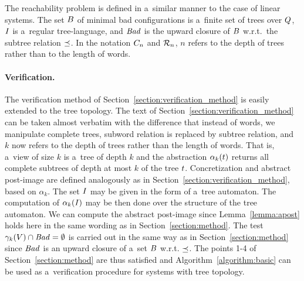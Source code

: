The reachability problem is defined in a~similar manner to the case of
linear systems. The set $B$ of minimal bad configurations is
a~finite set of trees over $Q$, $\mathit{I}$ is a~regular
tree-language, and $\mathit{Bad}$ is the upward closure of $B$ w.r.t.\ the
subtree relation $\preceq$.  In the notation $C_{n}$ and
$\mathcal{R}_{n}$, $n$ refers to the depth of trees rather than to the
length of words.

\paragraph{Verification.}
The verification method of Section~\ref{section:verification_method}
is easily extended to the tree topology. The text of
Section~\ref{section:verification_method} can be taken almost verbatim
with the difference that instead of words, we manipulate complete
trees, subword relation is replaced by subtree relation, and $k$ now
refers to the depth of trees rather than the length of words.
%
That is, a~view of size $k$ is a~tree of depth $k$ and the
abstraction $\alpha_k(t)$ returns all complete subtrees of 
depth at most $k$ of the tree $t$. 
Concretization and abstract post-image are defined analogously as in Section~\ref{section:verification_method}, based on $\alpha_k$. 
The set $\mathit{I}$ may be given in the form of a~tree automaton. 
The computation of $\alpha_k(\mathit{I})$ may be then done over the structure of the tree automaton.
We can compute the abstract
post-image since Lemma~\ref{lemma:apost} holds here in the same wording as in Section~\ref{section:method}. 
The test $\gamma_{k}(V)\cap\mathit{Bad}=\emptyset$ is carried out in the same way as in Section~\ref{section:method} since $\mathit{Bad}$ is an upward closure of a~set $B$ w.r.t.
$\preceq$. The points 1-4 of Section~\ref{section:method} are thus satisfied and Algorithm~\ref{algorithm:basic} can be used as a~verification procedure for systems with tree topology.


